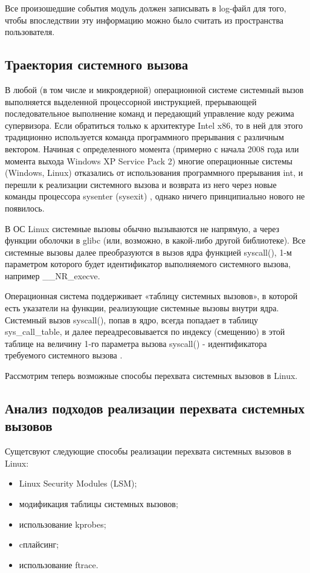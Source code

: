 \documentclass[a4paper,14pt]{article}
\begin{document}
Все произошедшие события модуль должен записывать в log-файл для того, чтобы впоследствии эту информацию можно было считать из пространства пользователя.


\subsection{Траектория системного вызова}

В любой (в том числе и микроядерной) операционной системе системный вызов выполняется выделенной процессорной инструкцией, прерывающей последовательное выполнение команд и передающий управление коду режима супервизора. Если обратиться только к архитектуре Intel x86, то в ней для этого традиционно используется команда программного прерывания с различным вектором. Начиная с определенного момента (примерно с начала 2008 года или момента выхода Windows XP Service Pack 2) многие операционные системы (Windows, Linux) отказались от использования программного прерывания int, и перешли к реализации системного вызова и возврата из него через новые команды процессора sysenter (sysexit) \cite{zirulnik}, однако ничего принципиально нового не появилось.

В ОС Linux системные вызовы обычно вызываются не напрямую, а через функции оболочки в glibc (или, возможно, в какой-либо другой библиотеке). Все системные вызовы далее преобразуются в вызов ядра функцией syscall(), 1-м параметром которого будет идентификатор выполняемого системного вызова, например \_\_NR\_execve.


Операционная система поддерживает «таблицу системных вызовов», в которой есть указатели на функции, реализующие системные вызовы внутри ядра. Системный вызов syscall(), попав в ядро, всегда попадает в таблицу sys\_call\_table, и далее переадресовывается по индексу (смещению) в этой таблице на величину 1-го параметра вызова syscall() - идентификатора требуемого системного вызова \cite{zirulnik}.

Рассмотрим теперь возможные способы перехвата системных вызовов в Linux.

\subsection{Анализ подходов реализации перехвата системных вызовов}

Сущетсвуют следующие способы реализации перехвата системных вызовов в Linux:

\begin{itemize}
	\item Linux Security Modules (LSM);
	\item модификация таблицы системных вызовов;
	\item использование kprobes;
	\item cплайсинг;
	\item использование ftrace.
\end{itemize}
\end{document}
